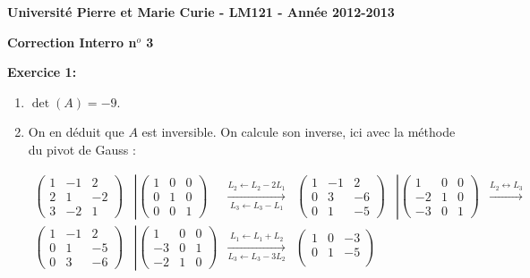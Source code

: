 \documentclass[a4paper, 10pt]{article}
\theoremstyle{plain}
\begin{document}
\noindent
\large
\textbf{Universit\'e Pierre et Marie Curie 
 - LM121 -
Ann\'ee 2012-2013}\\

\begin{center}
\Large
\textbf{Correction Interro n$^o$ 3}
\end{center}
\normalsize

\medskip
\noindent
\textbf{Exercice 1:}\\
\begin{enumerate}
\item 
$\det (A) = -9 $.
\item 
On en déduit que $A$ est inversible.
On calcule son inverse, ici avec la méthode du pivot de Gauss : 

\begin{align*}
\begin{pmatrix}
1 & -1 & 2 \\
2 & 1 & -2 \\
3 & -2 & 1 
\end{pmatrix}
&
\left| 
\begin{pmatrix}
1 & 0&0\\
0 & 1 & 0 \\
0 & 0 & 1
\end{pmatrix}
\right. 
& \xrightarrow[L_3 \leftarrow L_3-L_1]{L_2 \leftarrow L_2 - 2L_1}
& 
\begin{pmatrix}
1 & -1 & 2 \\
0 & 3 & -6 \\
0 & 1 & -5 
\end{pmatrix}
&
\left| 
\begin{pmatrix}
1 & 0&0\\
-2 & 1 & 0 \\
-3 & 0 & 1
\end{pmatrix}
\right. 
& \xrightarrow{L_2 \leftrightarrow L_3} \\
\begin{pmatrix}
1 & -1 & 2 \\
0 & 1 & -5 \\
0 & 3 & -6 
\end{pmatrix}
&
\left| 
\begin{pmatrix}
1 & 0&0\\
-3 & 0 & 1 \\
-2 & 1 & 0
\end{pmatrix}
\right. 
& \xrightarrow[L_3 \leftarrow L_3-3L_2]{L_1 \leftarrow L_1 + L_2} 
&
\begin{pmatrix}
1 & 0 & -3 \\
0 & 1 & -5 \\

\end{pmatrix}
\end{align*}
\end{enumerate}
\end{document}
